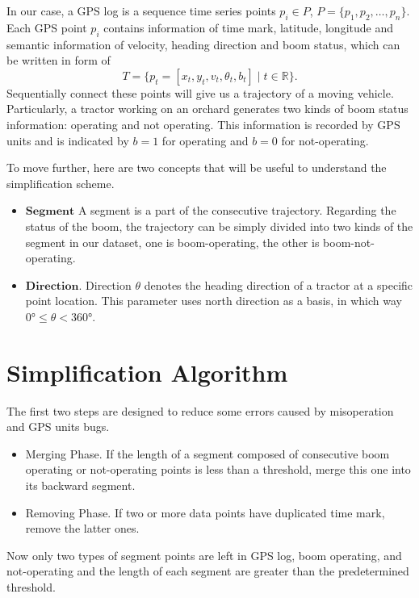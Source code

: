 In our case, a GPS log is a sequence time series points $p_i \in P$, $P=\{ p_1,p_2, \ldots, p_n \}$. Each GPS point $p_i$ contains information of time mark, latitude, longitude and semantic information of velocity, heading direction and boom status, which can be written in form of
\begin{equation}
T=\{p_t=[x_t,y_t,v_t,\theta_t,b_t] \mid t \in \mathbb{R} \}.
\end{equation}
Sequentially connect these points will give us a trajectory of a moving vehicle.
Particularly, a tractor working on an orchard generates two kinds of boom status information: operating and not operating. This information is recorded by GPS units and is indicated by $b=1$ for operating and $b=0$ for not-operating.


To move further, here are two concepts that will be useful to understand the simplification scheme.
\begin{itemize}
\item $\mathbf{Segment}$ A segment is a part of the consecutive trajectory. Regarding the status of the boom, the trajectory can be simply divided into two kinds of the segment in our dataset, one is boom-operating, the other is boom-not-operating. 
\item $\mathbf{Direction}$. Direction $\theta$ denotes the heading direction of a tractor at a specific point location. This parameter uses north direction as a basis, in which way $\ang{0} \leq \theta < \ang{360}$.
\end{itemize}



\section{Simplification Algorithm}

The first two steps are designed to reduce some errors caused by misoperation and GPS units bugs.
\begin{itemize}
\item Merging Phase. If the length of a segment composed of consecutive boom operating or not-operating points is less than a threshold, merge this one into its backward segment. 
\item Removing Phase. If two or more data points have duplicated time mark, remove the latter ones. 
\end{itemize}
Now only two types of segment points are left in GPS log, boom operating, and not-operating and the length of each segment are greater than the predetermined threshold.

